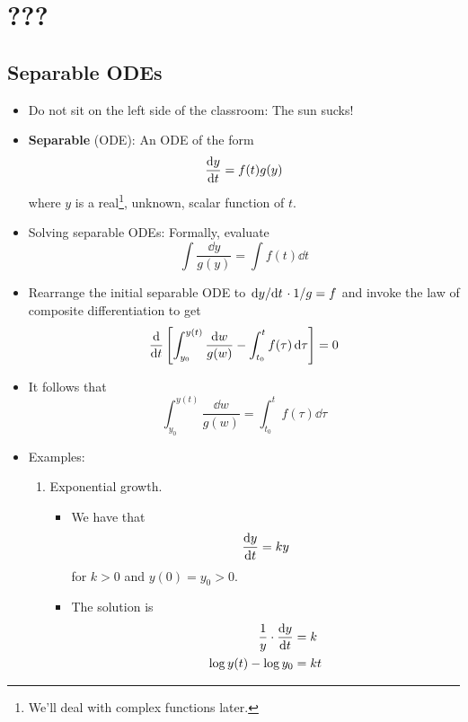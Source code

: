 \documentclass[../notes.tex]{subfiles}
\begin{document}
\chapter{???}
\section{Separable ODEs}
\begin{itemize}
    \item {}Do not sit on the left side of the classroom: The sun sucks!
    \item \textbf{Separable} (ODE): An ODE of the form
    \begin{equation*}
        \dv{y}{t} = f(t)g(y)
    \end{equation*}
    where $y$ is a real\footnote{We'll deal with complex functions later.}, unknown, scalar function of $t$.
    \item Solving separable ODEs: Formally, evaluate
    \begin{equation*}
        \int\frac{\dd{y}}{g(y)} = \int f(t)\dd{t}
    \end{equation*}
    \item Rearrange the initial separable ODE to $\dv*{y}{t}\cdot 1/g=f$ and invoke the law of composite differentiation to get
    \begin{equation*}
        \dv{t}\left[ \int_{y_0}^{y(t)}\frac{\dd{w}}{g(w)}-\int_{t_0}^tf(\tau)\dd{\tau} \right] = 0
    \end{equation*}
    \item It follows that
    \begin{equation*}
        \int_{y_0}^{y(t)}\frac{\dd{w}}{g(w)} = \int_{t_0}^tf(\tau)\dd{\tau}
    \end{equation*}
    \item Examples:
    \begin{enumerate}
        \item Exponential growth.
        \begin{itemize}
            \item We have that
            \begin{equation*}
                \dv{y}{t} = ky
            \end{equation*}
            for $k>0$ and $y(0)=y_0>0$.
            \item The solution is
            \begin{align*}
                \frac{1}{y}\cdot\dv{y}{t} &= k\\
                \log y(t)-\log y_0 &= kt\\

\end{align*}
\end{itemize}
\end{enumerate}
\end{itemize}
\end{document}
